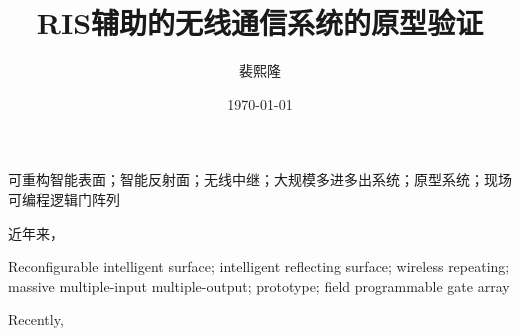\documentclass[supercite]{HustGraduPaper}
\title{RIS辅助的无线通信系统的原型验证} %
\author{裴熙隆} %
\date{\today} %
\begin{document}
\maketitle

\statement[confidentiality = false]

\clearpage %

\begin{cnabstract}{可重构智能表面；智能反射面；无线中继；大规模多进多出系统；原型系统；现场可编程逻辑门阵列}

	近年来，

\end{cnabstract}
\begin{enabstract}{Reconfigurable intelligent surface; intelligent reflecting surface; wireless repeating; massive multiple-input multiple-output; prototype; field programmable gate array}

	Recently,

\end{enabstract}

\tableofcontents
\end{document}
